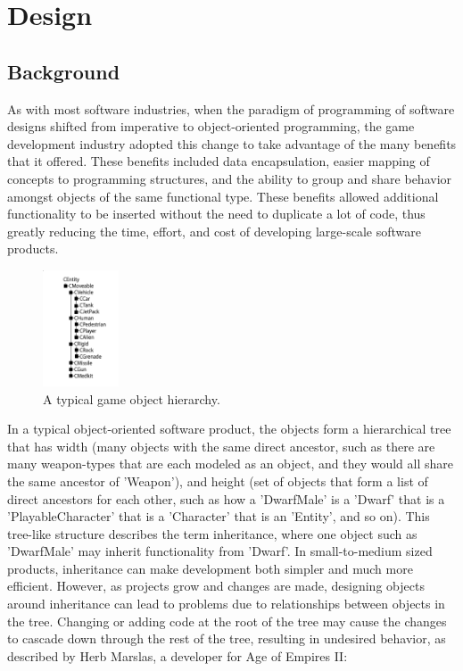 \section{Design}

\subsection{Background}
As with most software industries, when the paradigm of programming of software designs shifted from imperative to object-oriented programming, the game development industry adopted this change to take advantage of the many benefits that it offered. These benefits included data encapsulation, easier mapping of concepts to programming structures, and the ability to group and share behavior amongst objects of the same functional type. These benefits allowed additional functionality to be inserted without the need to duplicate a lot of code, thus greatly reducing the time, effort, and cost of developing large-scale software products.

\begin{figure}[h!]
  \centering \includegraphics[width=0.2\textwidth]{Images/tree}
  \caption{A typical game object hierarchy. \cite{west2006evolve}}
\end{figure}

In a typical object-oriented software product, the objects form a hierarchical tree that has width (many objects with the same direct ancestor, such as there are many weapon-types that are each modeled as an object, and they would all share the same ancestor of 'Weapon'), and height (set of objects that form a list of direct ancestors for each other, such as how a 'DwarfMale' is a 'Dwarf' that is a 'PlayableCharacter' that is a 'Character' that is an 'Entity', and so on). This tree-like structure describes the term inheritance, where one object such as 'DwarfMale' may inherit functionality from 'Dwarf'. In small-to-medium sized products, inheritance can make development both simpler and much more efficient. However, as projects grow and changes are made, designing objects around inheritance can lead to problems due to relationships between objects in the tree. Changing or adding code at the root of the tree may cause the changes to cascade down through the rest of the tree, resulting in undesired behavior, as described by Herb Marslas, a developer for Age of Empires II:

